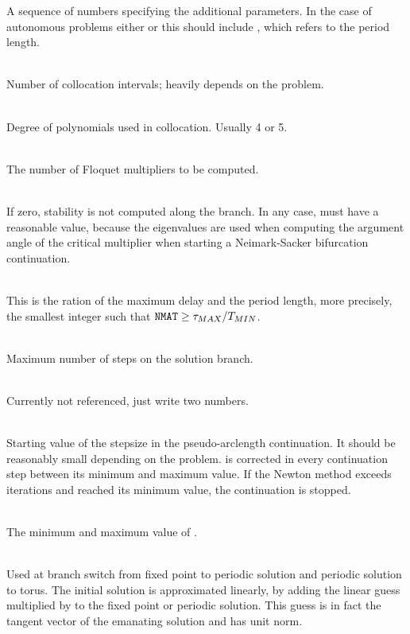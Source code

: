 \documentclass[10pt,a4paper]{ddedoc}
\begin{document}
\begin{description}
A sequence of numbers specifying the additional parameters. In
the case of autonomous problems either  or this should include , which refers to the period length.
%
\item[\funp{NINT}] ~\\
Number of collocation intervals; heavily depends on the problem.
%
\item[\funp{NDEG}] ~\\
Degree of polynomials used in collocation. Usually 4 or 5.
%
\item[\funp{NMUL}] ~\\
The number of Floquet multipliers to be computed.
%
\item[\funp{STAB}] ~\\
If zero, stability is not computed along the branch. In any case,  must have a reasonable value, because the eigenvalues are used when computing the argument angle of the critical multiplier when starting a Neimark-Sacker bifurcation continuation.
%
\item[\funp{NMAT}] ~\\
This is the ration of the maximum delay and the period length, more precisely, the smallest integer such that ${\tt NMAT} \ge \tau_{MAX}/T_{MIN}$.
%
\item[\funp{STEPS}] ~\\
Maximum number of steps on the solution branch.
%
\item[\funp{CPMIN}, \funp{CPMAX}] ~\\
Currently not referenced, just write two numbers.
%
\item[\funp{DS}] ~\\
Starting value of the stepsize in the pseudo-arclength continuation.
It should be reasonably small depending on the problem.  is corrected in every continuation step between its minimum and maximum value. If the Newton method exceeds  iterations and  reached its minimum value, the continuation is stopped.
%
\item[\funp{DSMIN}, \funp{DSMAX}] ~\\
The minimum and maximum value of .
%
\item[\funp{DSSTART}] ~\\
Used at branch switch from fixed point to periodic solution and periodic solution to torus. The initial solution is approximated linearly, by adding the linear guess multiplied by  to the fixed point or periodic solution. This guess is in fact the tangent vector of the emanating solution and has unit norm.

\end{description}
\end{document}
